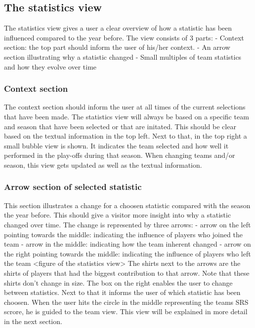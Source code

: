 \documentclass{sigchi}
\begin{document}
\subsection{The statistics view}
The statistics view gives a user a clear overview of how a statistic has been 
influenced compared to the year before. The view consists of 3 parts:
- Context section: the top part should inform the user of his/her context.
- An arrow section illustrating why a statistic changed
- Small multiples of team statistics and how they evolve over time
\subsubsection{Context section}
The context section should inform the user at all times of the current selections 
that have been made. The statistics view will always be based on a specific team
and season that have been selected or that are initated. This should be clear based
on the textual information in the top left. Next to that, in the top right a small 
bubble view is shown. It indicates the team selected and how well it performed in 
the play-offs during that season. When changing teams and/or season, this view gets 
updated as well as the textual information.

\subsubsection{Arrow section of selected statistic}
This section illustrates a change for a choosen statistic compared with the season
the year before. This should give a visitor more insight into why a statistic changed
over time. The change is represented by three arrows:
- arrow on the left pointing towards the middle: indicating the influence of players
who joined the team
- arrow in the middle: indicating how the team inherent changed
- arrow on the right pointing towards the middle: indicating the influence of players
who left the team
<figure of the statistics view>
The shirts next to the arrows are the shirts of players that had the biggest 
contribution to that arrow. Note that these shirts don't change in size. The box on 
the right enables the user to change between 
statistics. Next to that it informs the user of which statistic has been choosen. When 
the user hits the circle in the middle representing the teams SRS scrore, he is guided 
to the team view. This view will be explained in more detail in the next section.
\end{document}

